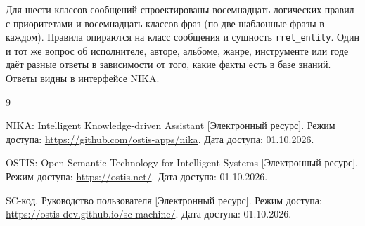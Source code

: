 
Для шести классов сообщений спроектированы восемнадцать логических правил с приоритетами и восемнадцать классов фраз (по две шаблонные фразы в каждом). Правила опираются на класс сообщения и сущность \texttt{rrel\_entity}. Один и тот же вопрос об исполнителе, авторе, альбоме, жанре, инструменте или годе даёт разные ответы в зависимости от того, какие факты есть в базе знаний. Ответы видны в интерфейсе NIKA.

\begin{thebibliography}{9}

	NIKA: Intelligent Knowledge-driven Assistant [Электронный ресурс]. \mdash  Режим доступа: \url{https://github.com/ostis-apps/nika}. \mdash  Дата доступа: 01.10.2026.

	OSTIS: Open Semantic Technology for Intelligent Systems [Электронный ресурс]. \mdash  Режим доступа: \url{https://ostis.net/}. \mdash  Дата доступа: 01.10.2026.

	SC-код. Руководство пользователя [Электронный ресурс]. \mdash  Режим доступа: \url{https://ostis-dev.github.io/sc-machine/}. \mdash  Дата доступа: 01.10.2026.
\end{thebibliography}
